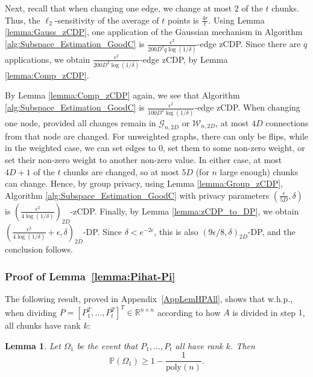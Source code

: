 \documentclass{article}
\newtheorem{lemma}{Lemma}
\newcommand{\mprob}{\mathbb{P}}
\begin{document}
Next, recall that when changing one edge, we change at most $2$ of the $t$ chunks. Thus, the $\ell_2$-sensitivity of the average of $t$ points is $\frac{4r}{t}$. Using Lemma \ref{lemma:Gauss_zCDP}, one application of the Gaussian mechanism in Algorithm \ref{alg:Subspace_Estimation_GoodC} is $\frac{\epsilon^2}{200D^2q\log(1/\delta)}$-edge zCDP. Since there are $q$ applications, we obtain $\frac{\epsilon^2}{200D^2\log(1/\delta)}$-edge zCDP, by Lemma \ref{lemma:Comp_zCDP}.

By Lemma \ref{lemma:Comp_zCDP} again, we see that Algorithm \ref{alg:Subspace_Estimation_GoodC} is $\frac{\epsilon^2}{100D^2\log(1/\delta)}$-edge zCDP. When changing one node, provided all changes remain in $\mathcal{G}_{n, 2D}$ or $\mathcal{W}_{n, 2D}$, at most $4D$ connections from that node are changed. For unweighted graphs, there can only be flips, while in the weighted case, we can set edges to $0$, set them to some non-zero weight, or set their non-zero weight to another non-zero value. In either case, at most $4D + 1$ of the $t$ chunks are changed, so at most $5D$ (for $n$ large enough) chunks can change. Hence, by group privacy, using Lemma \ref{lemma:Group_zCDP}, Algorithm \ref{alg:Subspace_Estimation_GoodC} with privacy parameters $\left(\frac{\epsilon}{5D}, \delta\right)$ is $\left(\frac{\epsilon^2}{4\log(1/\delta)}\right)_{2D}$-zCDP. Finally, by Lemma \ref{lemma:zCDP_to_DP}, we obtain $\left(\frac{\epsilon^2}{4\log(1/\delta)} + \epsilon, \delta\right)_{2D}$-DP. Since $\delta < e^{-2\epsilon}$, this is also $(9\epsilon/8, \delta)_{2D}$-DP, and the conclusion follows.


\subsubsection{Proof of Lemma~\ref{lemma:Pihat-Pi}}
\label{AppLemPihat}

The following result, proved in Appendix~\ref{AppLemHPAll}, shows that w.h.p., when dividing $P = [P_1^T, \dots, P_t^T]^T \in \mathbb{R}^{n \times n}$ according to how $A$ is divided in step $1$, all chunks have rank $k$:
\begin{lemma}
\label{lemma:hp_all_types}
Let $\Omega_1$ be the event that $P_1, \dots, P_t$ all have rank $k$. Then
\begin{equation*}
\mprob(\Omega_1) \ge 1 - \frac{1}{\mathrm{poly}(n)}.
\end{equation*}
\end{lemma}
\end{document}
